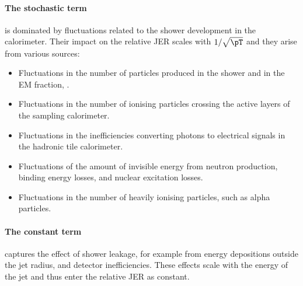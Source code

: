 \paragraph{The stochastic term} is dominated by fluctuations related to the shower development in the calorimeter. Their impact on the relative JER scales with $1 / \sqrt{\pT}$ and they arise from various sources:
\begin{itemize}
    \item Fluctuations in the number of particles produced in the shower and in the EM fraction, \fEM.
    \item Fluctuations in the number of ionising particles crossing the active layers of the sampling calorimeter.
    \item Fluctuations in the inefficiencies converting photons to electrical signals in the hadronic tile calorimeter.
    \item Fluctuations of the amount of invisible energy from neutron production, binding energy losses, and nuclear excitation losses.
    \item Fluctuations in the number of heavily ionising particles, such as alpha particles.
\end{itemize}

\paragraph{The constant term} captures the effect of shower leakage, for example from energy depositions outside the jet radius, and detector inefficiencies. These effects scale with the energy of the jet and thus enter the relative JER as constant.

